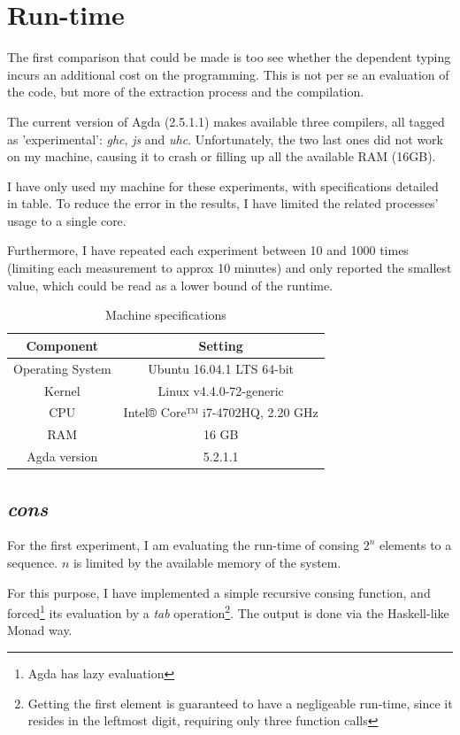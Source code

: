 \documentclass[12pt,twoside,notitlepage]{report}
\begin{document}
\section{Run-time}

The first comparison that could be made is too see whether the dependent typing incurs an additional cost on the programming. This is not per se an evaluation of the code, but more of the extraction process and the compilation. 

The current version of Agda (2.5.1.1) makes available three compilers, all tagged as 'experimental': \textit{ghc}, \textit{js} and \textit{uhc}. Unfortunately, the two last ones did not work on my machine, causing it to crash or filling up all the available RAM (16GB).

I have only used my machine for these experiments, with specifications detailed in table. To reduce the error in the results, I have limited the related processes' usage to a single core.

Furthermore, I have repeated each experiment between 10 and 1000 times (limiting each measurement to approx 10 minutes) and only reported the smallest value, which could be read as a lower bound of the runtime.

\begin{table}[h!]
\centering
	\begin{tabular}{c c} 
	\hline 
	Component & Setting \\
	\hline
 	Operating System & Ubuntu 16.04.1 LTS 64-bit \\
 	Kernel & Linux v4.4.0-72-generic \\ 
 	CPU & Intel® Core™ i7-4702HQ, 2.20 GHz \\
 	RAM & 16 GB \\
 	Agda version & 5.2.1.1 \\
	\hline
	\end{tabular}
\caption{Machine specifications}
\end{table} 

\subsection{\textit{cons}}

For the first experiment, I am evaluating the run-time of consing $2^n$ elements to a sequence. $n$ is limited by the available memory of the system. 

For this purpose, I have implemented a simple recursive consing function, and forced\footnote{Agda has lazy evaluation} its evaluation by a \textit{tab} operation\footnote{Getting the first element is guaranteed to have a negligeable run-time, since it resides in the leftmost digit, requiring only three function calls}. The output is done via the Haskell-like Monad way.
\end{document}
